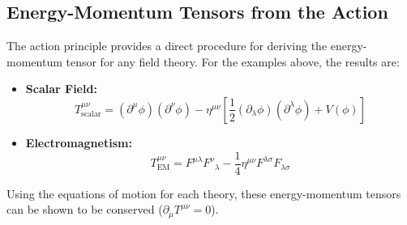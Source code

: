 \documentclass[11pt, a4paper]{report}
\begin{document}
\subsection*{Energy-Momentum Tensors from the Action}

The action principle provides a direct procedure for deriving the energy-momentum tensor for any field theory. For the examples above, the results are:
\begin{itemize}
    \item \textbf{Scalar Field:}
    \begin{equation}
        T^{\mu\nu}_{\text{scalar}} = (\partial^\mu\phi)(\partial^\nu\phi) - \eta^{\mu\nu}\left[\frac{1}{2}(\partial_\lambda\phi)(\partial^\lambda\phi) + V(\phi)\right]
    \end{equation}
    \item \textbf{Electromagnetism:}
    \begin{equation}
        T^{\mu\nu}_{\text{EM}} = {F^{\mu\lambda}}{F^\nu}_\lambda - \frac{1}{4}\eta^{\mu\nu} F^{\lambda\sigma}F_{\lambda\sigma}
    \end{equation}
\end{itemize}
Using the equations of motion for each theory, these energy-momentum tensors can be shown to be conserved ($\partial_\mu T^{\mu\nu} = 0$).

\end{document}
